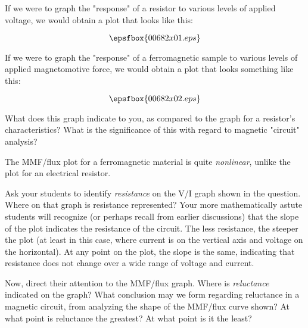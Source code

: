 

If we were to graph the "response" of a resistor to various levels of applied voltage, we would obtain a plot that looks like this:

$$\epsfbox{00682x01.eps}$$

If we were to graph the "response" of a ferromagnetic sample to various levels of applied magnetomotive force, we would obtain a plot that looks something like this:

$$\epsfbox{00682x02.eps}$$

What does this graph indicate to you, as compared to the graph for a resistor's characteristics?  What is the significance of this with regard to magnetic "circuit" analysis?







The MMF/flux plot for a ferromagnetic material is quite {\it nonlinear}, unlike the plot for an electrical resistor.







Ask your students to identify {\it resistance} on the V/I graph shown in the question.  Where on that graph is resistance represented?  Your more mathematically astute students will recognize (or perhaps recall from earlier discussions) that the slope of the plot indicates the resistance of the circuit.  The less resistance, the steeper the plot (at least in this case, where current is on the vertical axis and voltage on the horizontal).  At any point on the plot, the slope is the same, indicating that resistance does not change over a wide range of voltage and current.

Now, direct their attention to the MMF/flux graph.  Where is {\it reluctance} indicated on the graph?  What conclusion may we form regarding reluctance in a magnetic circuit, from analyzing the shape of the MMF/flux curve shown?  At what point is reluctance the greatest?  At what point is it the least?




